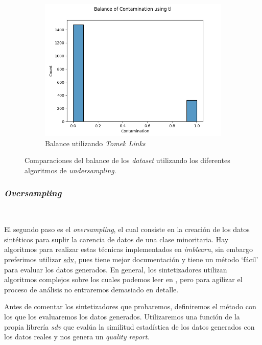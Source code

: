 \begin{figure}[!ht]
\begin{subfigure}[b]{0.3\textwidth}
        \includegraphics[width=\textwidth]{media/images/under-sampling/tl.png}
        \caption{Balance utilizando \textit{Tomek Links}}
    \end{subfigure}
    \caption{Comparaciones del balance de los \textit{dataset} utilizando los diferentes algoritmos de \textit{undersampling}.}\label{fig:undersampling-methods-balance}
\end{figure}
\clearpage

\subsubsection{\textit{Oversampling}}\ \label{sec:oversampling}

El segundo paso es el \textit{oversampling}, el cual consiste en la creación de los datos sintéticos para suplir la carencia de datos de una clase minoritaria. Hay algoritmos para realizar estas técnicas implementados en \textit{imblearn}, sin embargo preferimos utilizar \href{https://sdv.dev/}{sdv}, pues tiene mejor documentación y tiene un método `fácil' para evaluar los datos generados. \cite{Synthesi69:online} En general, los sintetizadores utilizan algoritmos complejos sobre los cuales podemos leer en \cite{Synthesi69:online}, pero para agilizar el proceso de análisis no entraremos demasiado en detalle.

Antes de comentar los sintetizadores que probaremos, definiremos el método con los que los evaluaremos los datos generados. Utilizaremos una función de la propia librería \textit{sdv} que evalúa la similitud estadística de los datos generados con los datos reales y nos genera un \textit{quality report}.

